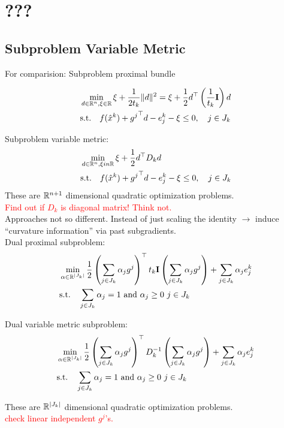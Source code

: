\section{???}

\subsection{Subproblem Variable Metric}

For comparision: Subproblem proximal bundle

\begin{align}
	&\min_{d \in \mathbb{R}^n, \xi \in \mathbb{R}} \xi + \frac{1}{2t_k}\|d\|^2 = \xi + \frac{1}{2}d^{\top}\left(\frac{1}{t_k}\mathbf{I}\right)d \\
	&\text{s.t.} \quad f(\hat{x}^k)+{g^j}^{\top}d - e^k_j - \xi \leq 0, \quad j \in J_k
\end{align}

Subproblem variable metric:
\begin{align}
	&\min_{d \in \mathbb{R}^n, \xi in \mathbb{R}} \xi + \frac{1}{2}d^{\top}D_kd \\
	&\text{s.t.} \quad f(\hat{x}^k)+{g^j}^{\top}d - e^k_j - \xi \leq 0, \quad j \in J_k
\end{align}
These are \(\mathbb{R}^{n+1}\) dimensional quadratic optimization problems.\\

\textcolor{red}{Find out if \(D_k\) is diagonal matrix! Think not.} \\

Approaches not so different. Instead of just scaling the identity \(\rightarrow\) induce ``curvature information'' via past subgradients. \\

Dual proximal subproblem:
\begin{align}
	&\min_{\alpha \in \mathbb{R}^{|J_k|}} \frac{1}{2} \left(\sum_{j \in J_k}{\alpha_jg^j}\right)^{\top} t_k\mathbf{I} \left(\sum_{j \in J_k}{\alpha_jg^j}\right) + \sum_{j \in J_k}{\alpha_j e_j^k} \\
		&\text{s.t.} \quad \sum_{j \in J_k}{\alpha_j} = 1 \text{ and } \alpha_j \geq 0 ~ j \in J_k
\end{align}


Dual variable metric subproblem:
\begin{align}
	&\min_{\alpha \in \mathbb{R}^{|J_k|}} \frac{1}{2} \left(\sum_{j \in J_k}{\alpha_jg^j}\right)^{\top} D^{-1}_k \left(\sum_{j \in J_k}{\alpha_jg^j}\right) + \sum_{j \in J_k}{\alpha_j e_j^k} \\
		&\text{s.t.} \quad \sum_{j \in J_k}{\alpha_j} = 1 \text{ and } \alpha_j \geq 0 ~ j \in J_k
\end{align}

These are \(\mathbb{R}^{|J_k|}\) dimensional quadratic optimization problems. \\

\textcolor{red}{check linear independent \(g^j\)'s.}
